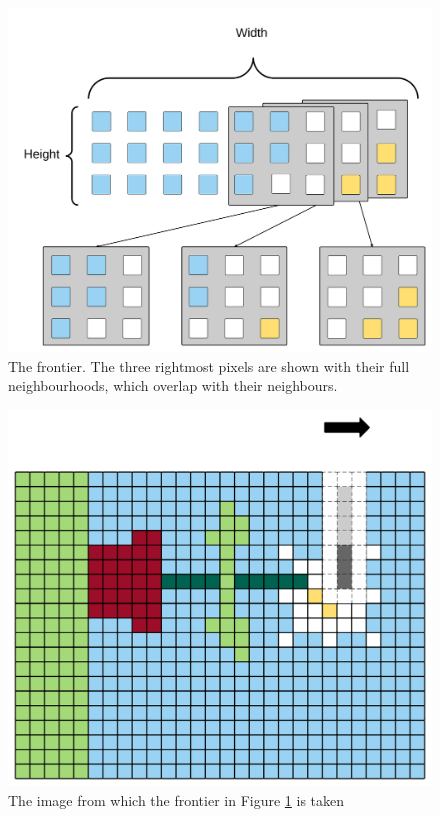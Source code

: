 \begin{figure}[h!]
    \centering
    \includegraphics[width=\linewidth]{img/frontier1_small.png}
    \caption[The frontier]{The frontier. The three rightmost pixels are shown with their full neighbourhoods, which overlap with their neighbours.}
    \label{fig:frontier1}
\end{figure}

\begin{figure}[h!]
    \centering
    \includegraphics[width=\linewidth]{img/frontier2_small.png}
    \caption{The image from which the frontier in Figure \ref{fig:frontier1} is taken}
    \label{fig:frontier2}
\end{figure}

